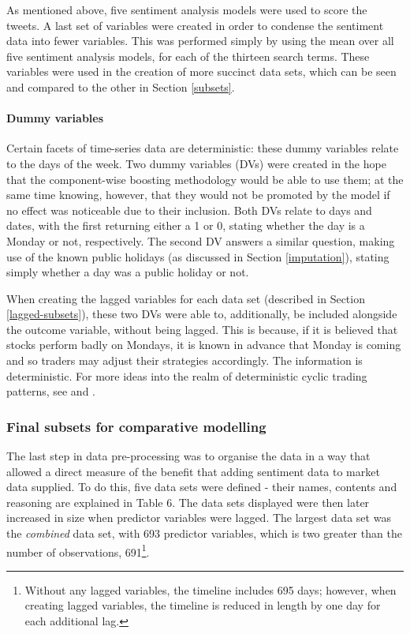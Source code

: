 \documentclass{article}
\begin{document}
As mentioned above, five sentiment analysis models were used to score the tweets. A last set of variables were created in order to condense the sentiment data into fewer variables. This was performed simply by using the mean over all five sentiment analysis models, for each of the thirteen search terms. These variables were used in the creation of more succinct data sets, which can be seen and compared to the other in Section \ref{subsets}.


\paragraph{Dummy variables \label{dummy-vars}}
\label{sec-6-2-3-3}

Certain facets of time-series data are deterministic: these dummy variables relate to the days of the week. Two dummy variables (DVs) were created in the hope that the component-wise boosting methodology would be able to use them; at the same time knowing, however, that they would not be promoted by the model if no effect was noticeable due to their inclusion. Both DVs relate to days and dates, with the first returning either a 1 or 0, stating whether the day is a Monday or not, respectively. The second DV answers a similar question, making use of the known public holidays (as discussed in Section \ref{imputation}), stating simply whether a day was a public holiday or not.

When creating the lagged variables for each data set (described in Section \ref{lagged-subsets}), these two DVs were able to, additionally, be included alongside the outcome variable, without being lagged. This is because, if it is believed that stocks perform badly on Mondays, it is known in advance that Monday is coming and so traders may adjust their strategies accordingly. The information is deterministic. For more ideas into the realm of deterministic cyclic trading patterns, see \cite{gondhalekar2003blue} and \cite{kamstra2003winter}.


\subsubsection{Final subsets for comparative modelling \label{subsets}}
\label{sec-6-2-4}

The last step in data pre-processing was to organise the data in a way that allowed a direct measure of the benefit that adding sentiment data to market data supplied. To do this, five data sets were defined - their names, contents and reasoning are explained in Table 6. The data sets displayed were then later increased in size when predictor variables were lagged. The largest data set was the \emph{combined} data set, with 693 predictor variables, which is two greater than the number of observations, 691\footnote{Without any lagged variables, the timeline includes 695 days; however, when creating lagged variables, the timeline is reduced in length by one day for each additional lag.}.
\end{document}
